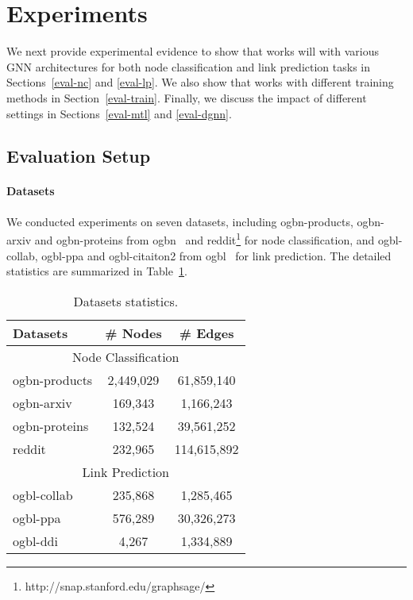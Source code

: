 \section{Experiments}
\label{experiment}
We next provide experimental evidence to show that \method works will with various GNN architectures for both node classification and link prediction tasks in Sections~\ref{eval-nc} and  \ref{eval-lp}.
We also show that \method works with different training methods in Section~\ref{eval-train}. 
Finally, we discuss the impact of different \method settings in Sections~\ref{eval-mtl} and \ref{eval-dgnn}.

\subsection{Evaluation Setup}
\paragraph{Datasets} We conducted experiments on seven datasets, including ogbn-products, ogbn-arxiv and ogbn-proteins from ogbn~\cite{hu2020open} and reddit\footnote{http://snap.stanford.edu/graphsage/} for node classification, and ogbl-collab, ogbl-ppa and ogbl-citaiton2 from ogbl~\cite{hu2020open} for link prediction. The detailed statistics are summarized in Table~\ref{tab:dataset}.

\begin{table}[t]
\centering
\begin{threeparttable}
 \caption{Datasets statistics.}
\label{tab:dataset}
 \centering
\begin{tabular}{lcc}
 \toprule 
Datasets & \# Nodes & \# Edges \\
\midrule
\multicolumn{3}{c}{Node Classification} \\
\midrule
ogbn-products & 2,449,029 & 61,859,140 \\
ogbn-arxiv & 169,343 & 1,166,243 \\
ogbn-proteins & 132,524 & 39,561,252 \\
reddit & 232,965 & 114,615,892 \\
\midrule
\multicolumn{3}{c}{Link Prediction} \\
\midrule
ogbl-collab & 235,868 & 1,285,465 \\
ogbl-ppa & 576,289 & 30,326,273 \\
ogbl-ddi & 4,267 & 1,334,889 \\
\bottomrule
\end{tabular}
\end{threeparttable}
\end{table}

